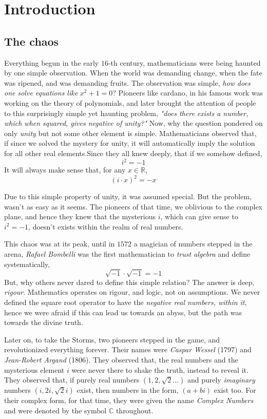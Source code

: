 \chapter{Introduction}

\section{The chaos}
Everything begun in the early $16$-th century, mathematicians were being haunted by one simple observation. When the world was demanding change, when the fate was ripened, and was demanding fruits. 
The observation was simple, \emph{how does one solve equations like} $x^2 + 1 = 0$?
Pioneers like cardano, in his famous work was working on the theory of polynomials, and later brought the attention of people to this surprisingly simple yet haunting problem, \emph{"does there exists a number, which when squared, gives negative of unity?"} 
Now, why the question pondered on only \emph{unity} but not some other element is simple.
Mathematicians observed that, if since we solved the mystery for unity, it will automatically imply the solution for all other real elements.Since they all knew deeply, that if we somehow defined,
\[
i^2 = -1
\]
It will always make sense that, for any $x \in \mathbb{R}$,
\[
(i\cdot x)^2 = -x
\]

Due to this simple property of unity, it was assumed special.
But the problem, wasn't as easy as it seems. The pioneers of that time, we oblivious to the complex plane, and hence they knew that the mysterious $i$, which can give sense to $i^2 = -1$, doesn't exists within the realm of real numbers.

This chaos was at its peak, until in $1572$ a magician of numbers stepped in the arena, \emph{Rafael Bombelli} was the first mathematician to \emph{trust algebra} and define systematically,
\[
\sqrt{-1} \cdot \sqrt{-1} = -1
\]
But, why others never dared to define this simple relation?
The answer is deep, \emph{rigour}. Mathematics operates on rigour, and logic, not on assumptions. We never defined the square root operator to have the \emph{negative real numbers, within it}, hence we were afraid if this can lead us towards an abyss, but the path was towards the divine truth.


Later on, to take the Storms, two pioneers stepped in the game, and revolutionized everything forever. Their names were \emph{Caspar Wessel} (1797) and \emph{Jean-Robert Argand} (1806).
They observed that, the real numbers and the mysterious element $i$ were never there to shake the truth, instead to reveal it. They observed that, if purely real numbers $(1, 2, \sqrt{2} \dots )$ and purely \emph{imaginary} numbers $(i, 2i, \sqrt{2} i)$ exist, then numbers in the form, $(a + bi)$ exist too. 
For their complex form, for that time, they were given the name \emph{Complex Numbers} and were denoted by the symbol $\mathbb{C}$ throughout.

